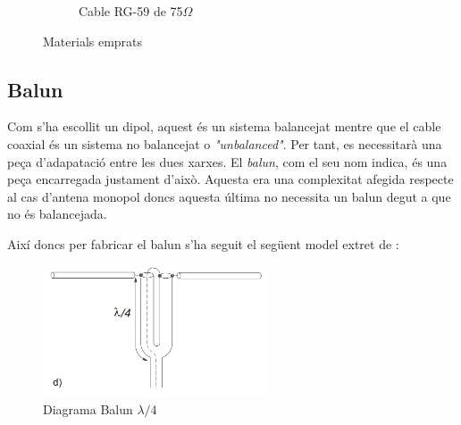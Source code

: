 \begin{figure}[H]
\begin{subfigure}{.5\textwidth}
	\caption{Cable RG-59 de 75$\Omega$}
	\label{cable}
\end{subfigure}
\caption{Materials emprats}
\label{Materiales}
\end{figure}
\subsection{Balun}

Com s'ha escollit un dipol, aquest és un sistema balancejat mentre que el cable coaxial és un sistema no balancejat o \textit{"unbalanced"}. Per tant, es necessitarà una peça d'adapatació entre les dues xarxes. El \textit{balun}, com el seu nom indica, és una peça encarregada justament d'això. Aquesta era una complexitat afegida respecte al cas d'antena monopol doncs aquesta última no necessita un balun degut a que no és balancejada. 

Així doncs per fabricar el balun s'ha seguit el següent model extret de \cite{aznar2004antenas}:

\begin{figure}[H]
	\centering
	\includegraphics[width=0.6\textwidth]{./images/balun}
	\caption{Diagrama Balun $\lambda/4$}
	\label{balun}
\end{figure}

